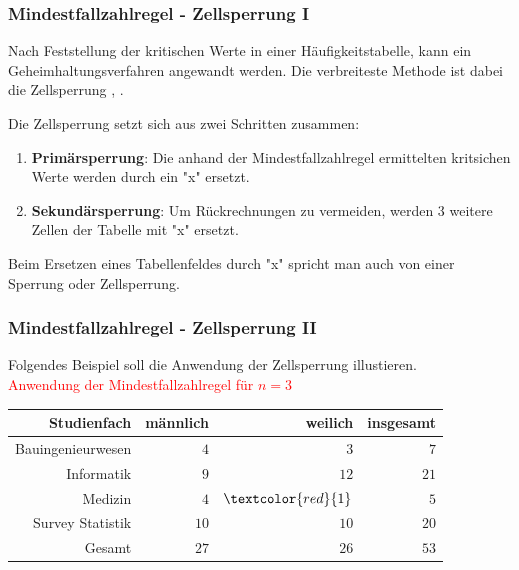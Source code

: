 \documentclass[aspectratio=169]{beamer}
\begin{document}
\begin{frame}
    \frametitle{Mindestfallzahlregel - Zellsperrung I}
    Nach Feststellung der kritischen Werte in einer Häufigkeitstabelle, kann ein Geheimhaltungsverfahren angewandt werden. Die verbreiteste Methode ist dabei die Zellsperrung \cite{Rothe-1}, \cite{Nickl}.
    \begin{theorem}[Zellsperrung]
        Die Zellsperrung setzt sich aus zwei Schritten zusammen:
        \begin{enumerate}
            \item \textbf{Primärsperrung}: Die anhand der Mindestfallzahlregel ermittelten kritsichen Werte werden durch ein "x" ersetzt.
            \item \textbf{Sekundärsperrung}: Um Rückrechnungen zu vermeiden, werden 3 weitere Zellen der Tabelle mit "x" ersetzt.
        \end{enumerate}
    \end{theorem}
    Beim Ersetzen eines Tabellenfeldes durch "x" spricht man auch von einer Sperrung oder Zellsperrung.
\end{frame}


\begin{frame}
    \frametitle{Mindestfallzahlregel - Zellsperrung II}
    Folgendes Beispiel soll die Anwendung der Zellsperrung illustieren. \\
    \textcolor{red}{Anwendung der Mindestfallzahlregel für $n = 3$}
    \begin{center}
        \begin{tabular}{ r r r r }
         \textbf{Studienfach} \vline & \textbf{männlich} & \textbf{weilich} & \textbf{insgesamt} \\ 
         \hline
         Bauingenieurwesen \vline & $4$ & $3$ & $7$ \\
         Informatik \vline & $9$ & $12$ & $21$ \\  
         Medizin \vline & $4$ & $\textcolor{red}{1}$ & $5$ \\
         Survey Statistik \vline & $10$ & $10$ & $20$ \\
         \hline
         Gesamt \vline & $27$ & $26$ & $53$
        \end{tabular}
    \end{center}
\end{frame}
\end{document}
